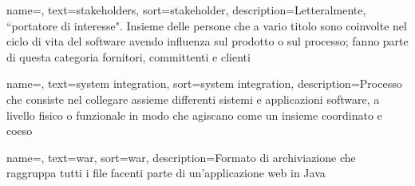{
    name=,
    text=stakeholders,
    sort=stakeholder,
    description={Letteralmente, ``portatore di interesse". Insieme delle persone che a vario titolo sono coinvolte nel ciclo di vita del software avendo influenza sul prodotto o sul processo; fanno parte di questa categoria fornitori, committenti e clienti}
}

{
    name=,
    text=system integration,
    sort=system integration,
    description={Processo che consiste nel collegare assieme differenti sistemi e applicazioni software, a livello fisico o funzionale in modo che agiscano come un insieme coordinato e coeso}
}

{
    name=,
    text=war,
    sort=war,
    description={Formato di archiviazione che raggruppa tutti i file facenti parte di un'applicazione web in Java}
}